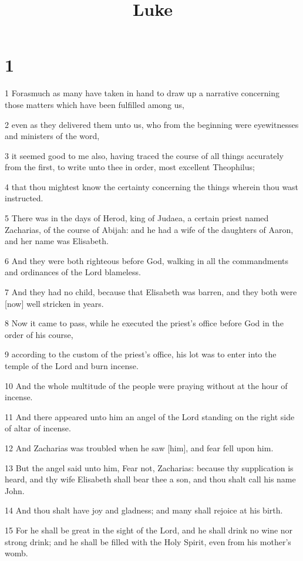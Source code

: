 

\title{Luke}

\chapter{1}

\par 1 Forasmuch as many have taken in hand to draw up a narrative concerning those matters which have been fulfilled among us,
\par 2 even as they delivered them unto us, who from the beginning were eyewitnesses and ministers of the word,
\par 3 it seemed good to me also, having traced the course of all things accurately from the first, to write unto thee in order, most excellent Theophilus;
\par 4 that thou mightest know the certainty concerning the things wherein thou wast instructed.
\par 5 There was in the days of Herod, king of Judaea, a certain priest named Zacharias, of the course of Abijah: and he had a wife of the daughters of Aaron, and her name was Elisabeth.
\par 6 And they were both righteous before God, walking in all the commandments and ordinances of the Lord blameless.
\par 7 And they had no child, because that Elisabeth was barren, and they both were [now] well stricken in years.
\par 8 Now it came to pass, while he executed the priest's office before God in the order of his course,
\par 9 according to the custom of the priest's office, his lot was to enter into the temple of the Lord and burn incense.
\par 10 And the whole multitude of the people were praying without at the hour of incense.
\par 11 And there appeared unto him an angel of the Lord standing on the right side of altar of incense.
\par 12 And Zacharias was troubled when he saw [him], and fear fell upon him.
\par 13 But the angel said unto him, Fear not, Zacharias: because thy supplication is heard, and thy wife Elisabeth shall bear thee a son, and thou shalt call his name John.
\par 14 And thou shalt have joy and gladness; and many shall rejoice at his birth.
\par 15 For he shall be great in the sight of the Lord, and he shall drink no wine nor strong drink; and he shall be filled with the Holy Spirit, even from his mother's womb.
